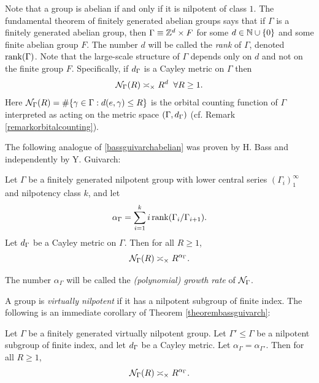 Note that a group is abelian if and only if it is nilpotent of class $1$. The fundamental theorem of finitely generated abelian groups says that if $\Gamma$ is a finitely generated abelian group, then $\Gamma \equiv \Z^d \times F$ for some $d\in\Neur$ and some finite abelian group $F$. The number $d$ will be called the \emph{rank} of $\Gamma$, denoted $\operatorname{rank}(\Gamma)$. Note that the large-scale structure of $\Gamma$ depends only on $d$ and not on the finite group $F$. Specifically, if $d_\Gamma$ is a Cayley metric on $\Gamma$ then
\begin{equation}
\label{bassguivarchabelian}
\mathcal N_\Gamma(R) \asymp_\times R^d \;\;\forall R \geq 1.
\end{equation}
Here $\mathcal N_\Gamma(R) = \#\{\gamma\in\Gamma : d(e,\gamma)\leq R\}$ is the orbital counting function of $\Gamma$ interpreted as acting on the metric space $(\Gamma,d_\Gamma)$ (cf. Remark \ref{remarkorbitalcounting}).

The following analogue of \eqref{bassguivarchabelian} was proven by H. Bass and independently by Y. Guivarch:

\begin{theorem}
\label{theorembassguivarch}
Let $\Gamma$ be a finitely generated nilpotent group with lower central series $(\Gamma_i)_1^\infty$ and nilpotency class $k$, and let
\[
\alpha_\Gamma = \sum_{i = 1}^k i\operatorname{rank}(\Gamma_i/\Gamma_{i + 1}).
\]
Let $d_\Gamma$ be a Cayley metric on $\Gamma$. Then for all $R\geq 1$,
\begin{equation}
\label{bassguivarch}
\mathcal N_\Gamma(R) \asymp_\times R^{\alpha_\Gamma}.
\end{equation}
\end{theorem}
The number $\alpha_\Gamma$ will be called the \emph{(polynomial) growth rate} of $\mathcal N_\Gamma$.

A group is \emph{virtually nilpotent} if it has a nilpotent subgroup of finite index. The following is an immediate corollary of Theorem \ref{theorembassguivarch}:
\begin{corollary}
\label{corollarybassguivarch}
Let $\Gamma$ be a finitely generated virtually nilpotent group. Let $\Gamma'\leq\Gamma$ be a nilpotent subgroup of finite index, and let $d_\Gamma$ be a Cayley metric. Let $\alpha_\Gamma = \alpha_{\Gamma'}$. Then for all $R\geq 1$,
\begin{equation}
\label{bassguivarch2}
\mathcal N_\Gamma(R) \asymp_\times R^{\alpha_\Gamma}.
\end{equation}
\end{corollary}


